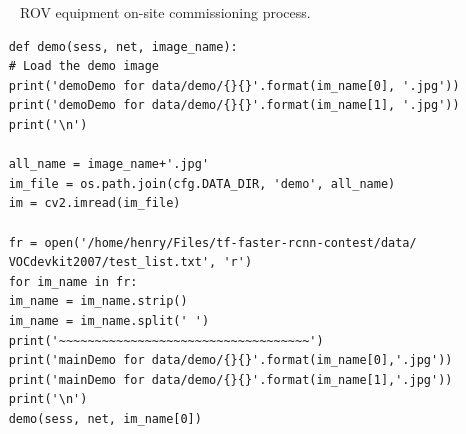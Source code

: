 \documentclass[a4paper]{article}
\begin{document}
	\begin{figure}
		\centering 
		\caption{ROV equipment on-site commissioning process.} 
		\label{p4} %
	\end{figure}
	
	\lstset{language=python}
	\begin{lstlisting}
	def demo(sess, net, image_name):
	# Load the demo image
	print('demoDemo for data/demo/{}{}'.format(im_name[0], '.jpg'))
	print('demoDemo for data/demo/{}{}'.format(im_name[1], '.jpg'))
	print('\n')
	
	all_name = image_name+'.jpg'
	im_file = os.path.join(cfg.DATA_DIR, 'demo', all_name)
	im = cv2.imread(im_file)
	
	fr = open('/home/henry/Files/tf-faster-rcnn-contest/data/
	VOCdevkit2007/test_list.txt', 'r')
	for im_name in fr:
	im_name = im_name.strip()
	im_name = im_name.split(' ')
	print('~~~~~~~~~~~~~~~~~~~~~~~~~~~~~~~~~~~')
	print('mainDemo for data/demo/{}{}'.format(im_name[0],'.jpg'))
	print('mainDemo for data/demo/{}{}'.format(im_name[1],'.jpg'))
	print('\n')
	demo(sess, net, im_name[0])
	\end{lstlisting}\label{g8}
	
\end{document}
